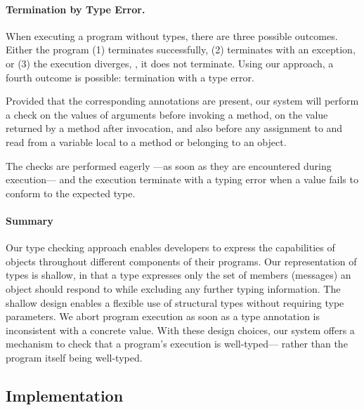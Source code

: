 \paragraph{Termination by Type Error.}

When executing a program without types, there are three possible outcomes.
Either the program (1) terminates successfully,
(2) terminates with an exception, or 
(3) the execution diverges, \ie, it does not terminate.
Using our approach, a
fourth outcome is possible: termination with a type error.

Provided that the corresponding annotations are present, 
our system will perform a check
on the values of arguments before invoking a method, 
on the value returned by a method after invocation, and
also before any assignment to and read from a variable local to
a method or belonging to an object. 

The checks are performed eagerly%
---as soon as they are encountered during execution---%
and the execution terminate with a typing error 
when a value fails to conform to the expected type.

\paragraph{Summary}
Our type checking approach enables developers to express
the capabilities of objects throughout different components of 
their programs.
Our representation of types is shallow,
in that a type expresses only the set of members (messages) an object
should respond to while excluding any further typing information. 
The shallow design enables a flexible use of structural types without
requiring type parameters.
We abort program execution as soon as
a type annotation is inconsistent with a concrete value. 
With these design choices, our system offers a mechanism to check that a program's execution
is well-typed---%
rather than the program itself being well-typed.

\subsection{Implementation} 
\label{ssec:implementation} 



